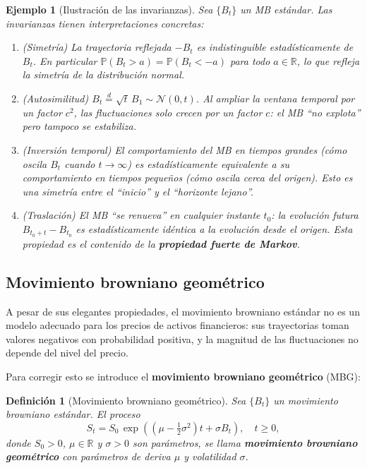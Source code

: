 \documentclass[12pt]{book}
\newtheorem{definition}{Definición}[chapter]
\newtheorem{example}{Ejemplo}[chapter]
\begin{document}
\begin{example}[Ilustración de las invarianzas]
\label{ex:invarianzas}
Sea $\{B_t\}$ un MB estándar. Las invarianzas tienen interpretaciones concretas:

\begin{enumerate}
    \item \textit{(Simetría)} La trayectoria reflejada $-B_t$ es indistinguible estadísticamente de $B_t$. En particular $\mathbb{P}(B_t > a) = \mathbb{P}(B_t < -a)$ para todo $a \in \mathbb{R}$, lo que refleja la simetría de la distribución normal.

    \item \textit{(Autosimilitud)} $B_t \overset{d}{=} \sqrt{t}\,B_1 \sim \mathcal{N}(0,t)$. Al ampliar la ventana temporal por un factor $c^2$, las fluctuaciones solo crecen por un factor $c$: el MB ``no explota'' pero tampoco se estabiliza.

    \item \textit{(Inversión temporal)} El comportamiento del MB en tiempos grandes (cómo oscila $B_t$ cuando $t\to\infty$) es estadísticamente equivalente a su comportamiento en tiempos pequeños (cómo oscila cerca del origen). Esto es una simetría entre el ``inicio'' y el ``horizonte lejano''.

    \item \textit{(Traslación)} El MB ``se renueva'' en cualquier instante $t_0$: la evolución futura $B_{t_0+t} - B_{t_0}$ es estadísticamente idéntica a la evolución desde el origen. Esta propiedad es el contenido de la \textbf{propiedad fuerte de Markov}.
\end{enumerate}
\end{example}

\subsection{Movimiento browniano geométrico}

A pesar de sus elegantes propiedades, el movimiento browniano estándar no es un modelo adecuado para los precios de activos financieros: sus trayectorias toman valores negativos con probabilidad positiva, y la magnitud de las fluctuaciones no depende del nivel del precio.

Para corregir esto se introduce el \textbf{movimiento browniano geométrico} (MBG):

\begin{definition}[Movimiento browniano geométrico]
\label{def:mbg}
Sea $\{B_t\}$ un movimiento browniano estándar. El proceso
\[
    S_t = S_0\,\exp\!\left(\left(\mu - \tfrac{1}{2}\sigma^2\right)t + \sigma B_t\right), \quad t \ge 0,
\]
donde $S_0 > 0$, $\mu \in \mathbb{R}$ y $\sigma > 0$ son parámetros, se llama \textbf{movimiento browniano geométrico} con parámetros de deriva $\mu$ y volatilidad $\sigma$.
\end{definition}
\end{document}
